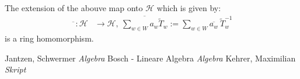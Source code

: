 \documentclass[]{article}
\begin{document}
\begin{lemma}
    The extension of the abouve map onto \(\mathscr{H}\) which is given by:
    \begin{align*}
        \overline{\phantom{x}}:\mathscr{H} &\rightarrow \mathscr{H}, \ \overline{\sum_{w \in W}^{}a_w \widetilde{T}_w} := \sum_{w \in W}^{} \overline{a_w} \ \widetilde{T}_w^{-1} 
    \end{align*}
    is a ring homomorphism. 
\end{lemma}






\begin{thebibliography}{9}
Jantzen, Schwermer
\textit{Algebra}
Bosch - Lineare Algebra
\textit{Algebra}
Kehrer, Maximilian
\textit{Skript}
\end{thebibliography}
\end{document}
